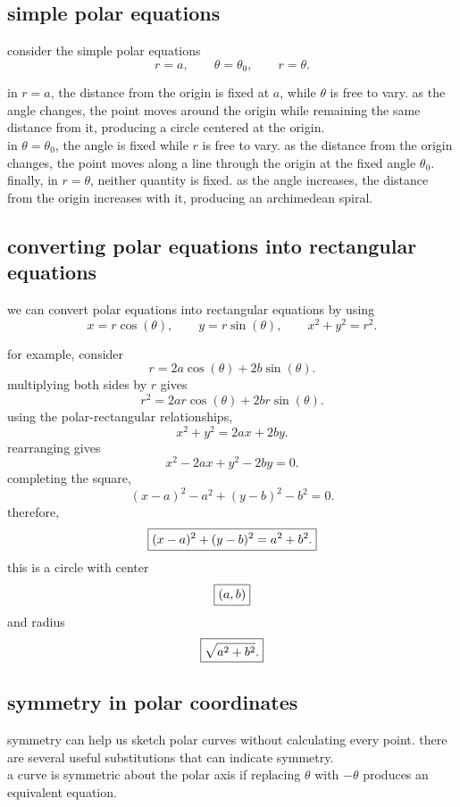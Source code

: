 \documentclass{article}
\newcommand{\mybox}[1]{\fbox{\ensuremath{\displaystyle #1}}}
\begin{document}
\subsection{simple polar equations}

consider the simple polar equations
\[
r=a,\qquad \theta=\theta_0,\qquad r=\theta.
\]

in $r=a$, the distance from the origin is fixed at $a$, while $\theta$ is free to vary. as the angle changes, the point moves around the origin while remaining the same distance from it, producing a circle centered at the origin.\\

in $\theta=\theta_0$, the angle is fixed while $r$ is free to vary. as the distance from the origin changes, the point moves along a line through the origin at the fixed angle $\theta_0$.\\

finally, in $r=\theta$, neither quantity is fixed. as the angle increases, the distance from the origin increases with it, producing an archimedean spiral.\\

\subsection{converting polar equations into rectangular equations}

we can convert polar equations into rectangular equations by using
\[
x=r\cos(\theta),\qquad
y=r\sin(\theta),\qquad
x^2+y^2=r^2.
\]

for example, consider
\[
r=2a\cos(\theta)+2b\sin(\theta).
\]
multiplying both sides by $r$ gives
\[
r^2=2ar\cos(\theta)+2br\sin(\theta).
\]
using the polar-rectangular relationships,
\[
x^2+y^2=2ax+2by.
\]
rearranging gives
\[
x^2-2ax+y^2-2by=0.
\]
completing the square,
\[
(x-a)^2-a^2+(y-b)^2-b^2=0.
\]
therefore,
\[
\mybox{
(x-a)^2+(y-b)^2=a^2+b^2.
}
\]
this is a circle with center
\[
\mybox{(a,b)}
\]
and radius
\[
\mybox{\sqrt{a^2+b^2}.}
\]

\subsection{symmetry in polar coordinates}

symmetry can help us sketch polar curves without calculating every point. there are several useful substitutions that can indicate symmetry.\\

a curve is symmetric about the polar axis if replacing $\theta$ with $-\theta$ produces an equivalent equation.\\
\end{document}
